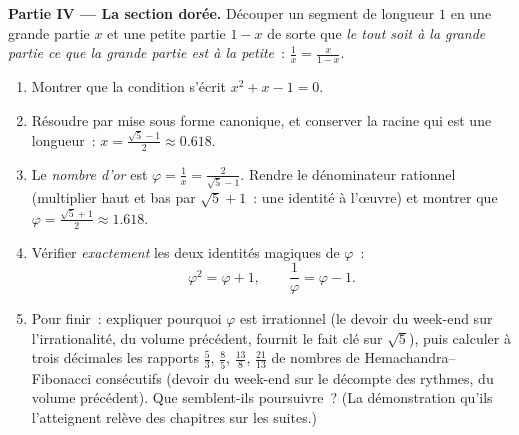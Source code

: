 \begin{problem}[{Devoir du week-end --- problèmes somme-produit,
la mise sous forme canonique telle qu'al-Khwarizmi la dessinait, et
l'équation $x^2 = x + 1$}]
\medskip
\noindent\textbf{Partie IV --- La section dorée.}
Découper un segment de longueur $1$ en une grande partie $x$ et une
petite partie $1 - x$ de sorte que
\emph{le tout soit à la grande partie ce que la grande partie est à la
petite}~: $\frac{1}{x} = \frac{x}{1 - x}$.
\begin{enumerate}[resume]
  \item Montrer que la condition s'écrit $x^2 + x - 1 = 0$.
  \item Résoudre par mise sous forme canonique, et conserver la
        racine qui est une longueur~:
        $x = \frac{\sqrt5 - 1}{2} \approx 0.618$.
  \item Le \emph{nombre d'or} est
        $\varphi = \frac1x = \frac{2}{\sqrt5 - 1}$. Rendre le
        dénominateur rationnel (multiplier haut et bas par
        $\sqrt5 + 1$~: une identité à l'œuvre) et montrer que
        $\varphi = \frac{\sqrt5 + 1}{2} \approx 1.618$.
  \item Vérifier \emph{exactement} les deux identités magiques de
        $\varphi$~:
        \[
        \varphi^2 = \varphi + 1,
        \qquad
        \frac{1}{\varphi} = \varphi - 1 .
        \]
  \item Pour finir~: expliquer pourquoi $\varphi$ est irrationnel
        (le devoir du week-end sur l'irrationalité, du volume
        précédent, fournit le fait clé sur $\sqrt5$), puis calculer à
        trois décimales les rapports $\frac53$, $\frac85$,
        $\frac{13}{8}$, $\frac{21}{13}$ de nombres de
        Hemachandra--Fibonacci consécutifs (devoir du week-end sur le
        décompte des rythmes, du volume précédent). Que semblent-ils
        poursuivre~? (La démonstration qu'ils l'atteignent relève des
        chapitres sur les suites.)
\end{enumerate}
\end{problem}
